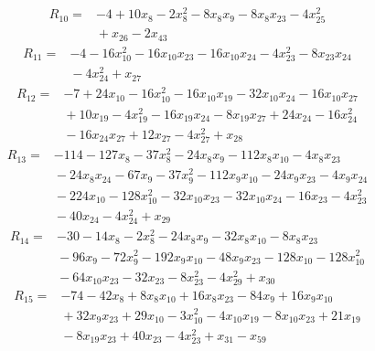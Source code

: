 {%
\begin{align*}
R_{10} ={}& -4 + 10x_{8} - 2x_{8}^{2} - 8x_{8} x_{9} - 8x_{8} x_{23} - 4x_{25}^{2} \\
&{}  + x_{26} - 2x_{43}
\end{align*}
\begin{align*}
R_{11} ={}& -4 - 16x_{10}^{2} - 16x_{10} x_{23} - 16x_{10} x_{24} - 4x_{23}^{2} - 8x_{23} x_{24} \\
&{}  - 4x_{24}^{2} + x_{27}
\end{align*}
\begin{align*}
R_{12} ={}& -7 + 24x_{10} - 16x_{10}^{2} - 16x_{10} x_{19} - 32x_{10} x_{24} - 16x_{10} x_{27} \\
&{}  + 10x_{19} - 4x_{19}^{2} - 16x_{19} x_{24} - 8x_{19} x_{27} + 24x_{24} - 16x_{24}^{2} \\
&{}  - 16x_{24} x_{27} + 12x_{27} - 4x_{27}^{2} + x_{28}
\end{align*}
\begin{align*}
R_{13} ={}& -114 - 127x_{8} - 37x_{8}^{2} - 24x_{8} x_{9} - 112x_{8} x_{10} - 4x_{8} x_{23} \\
&{}  - 24x_{8} x_{24} - 67x_{9} - 37x_{9}^{2} - 112x_{9} x_{10} - 24x_{9} x_{23} - 4x_{9} x_{24} \\
&{}  - 224x_{10} - 128x_{10}^{2} - 32x_{10} x_{23} - 32x_{10} x_{24} - 16x_{23} - 4x_{23}^{2} \\
&{}  - 40x_{24} - 4x_{24}^{2} + x_{29}
\end{align*}
\begin{align*}
R_{14} ={}& -30 - 14x_{8} - 2x_{8}^{2} - 24x_{8} x_{9} - 32x_{8} x_{10} - 8x_{8} x_{23} \\
&{}  - 96x_{9} - 72x_{9}^{2} - 192x_{9} x_{10} - 48x_{9} x_{23} - 128x_{10} - 128x_{10}^{2} \\
&{}  - 64x_{10} x_{23} - 32x_{23} - 8x_{23}^{2} - 4x_{29}^{2} + x_{30}
\end{align*}
\begin{align*}
R_{15} ={}& -74 - 42x_{8} + 8x_{8} x_{10} + 16x_{8} x_{23} - 84x_{9} + 16x_{9} x_{10} \\
&{}  + 32x_{9} x_{23} + 29x_{10} - 3x_{10}^{2} - 4x_{10} x_{19} - 8x_{10} x_{23} + 21x_{19} \\
&{}  - 8x_{19} x_{23} + 40x_{23} - 4x_{23}^{2} + x_{31} - x_{59}
\end{align*}
}

